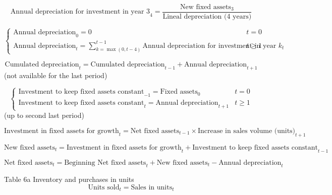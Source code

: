 \documentclass[12pt]{article}
\numberwithin{equation}{section}
\begin{document}
\begin{equation}
	\text{Annual depreciation for investment in year 3}_{4} = \frac{\text{New fixed assets}_{3}}{\text{Lineal depreciation (4 years)}}
\end{equation}

\begin{equation}
	\begin{cases}
		\text{Annual depreciation}_{0} = 0 & t=0 \\
		\text{Annual depreciation}_{t} = \sum_{k=\max(0,t-4)}^{t-1} \text{Annual depreciation for investment in year } k_{t} & t\geq1
	\end{cases}
\end{equation}

\begin{equation}
	\text{Cumulated depreciation}_{t} = \text{Cumulated depreciation}_{t-1} + \text{Annual depreciation}_{t+1}
\end{equation}
(not available for the last period)

\begin{equation}
	\begin{cases}
		\text{Investment to keep fixed assets constant}_{-1} = \text{Fixed assets}_{0} & t=0 \\
		\text{Investment to keep fixed assets constant}_{t} = \text{Annual depreciation}_{t+1} & t\geq1
	\end{cases}
\end{equation}
(up to second last period)

\begin{equation}
	\text{Investment in fixed assets for growth}_{t} = \text{Net fixed assets}_{t-1} \times \text{Increase in sales volume (units)}_{t+1}
\end{equation}

\begin{equation}
	\text{New fixed assets}_{t} = \text{Investment in fixed assets for growth}_{t} + \text{Investment to keep fixed assets constant}_{t-1}
\end{equation}

\begin{equation}
	\text{Net fixed assets}_{t} = \text{Beginning Net fixed assets}_{t} + \text{New fixed assets}_{t} - \text{Annual depreciation}_{t}
\end{equation}


Table 6a Inventory and purchases in units
\begin{equation}
	\text{Units sold}_{t} = \text{Sales in units}_{t}
\end{equation}
\end{document}
